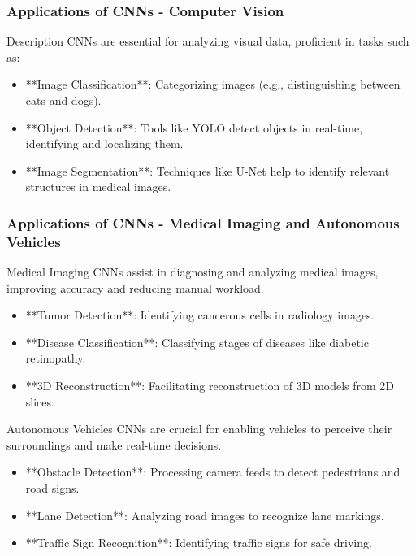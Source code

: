 \documentclass[aspectratio=169]{beamer}
\begin{document}
\begin{frame}[fragile]
    \frametitle{Applications of CNNs - Computer Vision}
    \begin{block}{Description}
        CNNs are essential for analyzing visual data, proficient in tasks such as:
    \end{block}
    \begin{itemize}
        \item **Image Classification**: Categorizing images (e.g., distinguishing between cats and dogs).
        \item **Object Detection**: Tools like YOLO detect objects in real-time, identifying and localizing them.
        \item **Image Segmentation**: Techniques like U-Net help to identify relevant structures in medical images.
    \end{itemize}
\end{frame}

\begin{frame}[fragile]
    \frametitle{Applications of CNNs - Medical Imaging and Autonomous Vehicles}
    \begin{block}{Medical Imaging}
        CNNs assist in diagnosing and analyzing medical images, improving accuracy and reducing manual workload.
    \end{block}
    \begin{itemize}
        \item **Tumor Detection**: Identifying cancerous cells in radiology images.
        \item **Disease Classification**: Classifying stages of diseases like diabetic retinopathy.
        \item **3D Reconstruction**: Facilitating reconstruction of 3D models from 2D slices.
    \end{itemize}
    
    \begin{block}{Autonomous Vehicles}
        CNNs are crucial for enabling vehicles to perceive their surroundings and make real-time decisions.
    \end{block}
    \begin{itemize}
        \item **Obstacle Detection**: Processing camera feeds to detect pedestrians and road signs.
        \item **Lane Detection**: Analyzing road images to recognize lane markings.
        \item **Traffic Sign Recognition**: Identifying traffic signs for safe driving.
    \end{itemize}
\end{frame}
\end{document}
